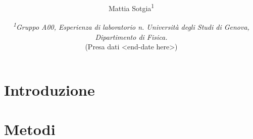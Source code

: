 \documentclass[italian, a4paper, 10pt, twocolumn]{../../style/lab_unige}
\begin{document}
\title{
}
\author{
Mattia Sotgia\textsuperscript{1}
}

\date{
    \textit{
    \textsuperscript{1}Gruppo A00, Esperienza di laboratorio n. %
    Università degli Studi di Genova, Dipartimento di Fisica.\\
    }
    \vspace{2ex}
    (Presa dati
    <end-date here>)
}


    \section{Introduzione}
    \label{section:introduction}


    \section{Metodi}
    \label{section:methods}

\end{document}
